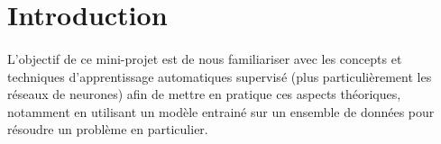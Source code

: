 \section{Introduction}
\paragraph{}
L'objectif de ce mini-projet est de nous familiariser avec les concepts et techniques d'apprentissage automatiques supervisé (plus particulièrement les réseaux de neurones) afin de mettre en pratique ces aspects théoriques, notamment en utilisant un modèle entrainé sur un ensemble de données pour résoudre un problème en particulier.